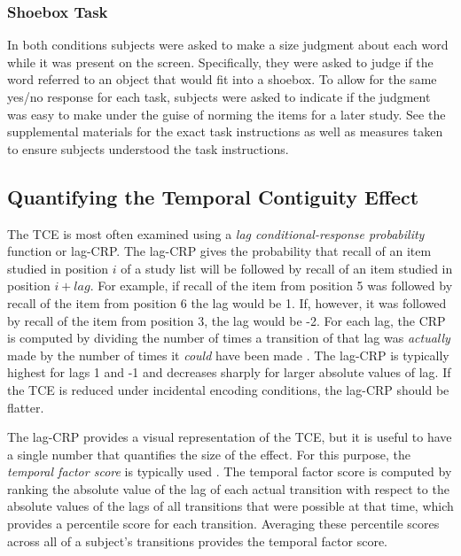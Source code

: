 \documentclass[jou,natbib,floatsintext]{apa6} %
\begin{document}
\subsubsection{Shoebox Task} In both conditions subjects were asked to make a size judgment about each word while it was present on the screen. Specifically, they were asked  to judge if the word referred to an object that would fit into a shoebox. To allow for the same yes/no response for each task, subjects were asked to indicate if the judgment was easy to make under the guise of norming the items for a later study. See the supplemental materials for the exact task instructions as well as measures taken to ensure subjects understood the task instructions.

\subsection{Quantifying the Temporal Contiguity Effect} The TCE is most often examined using a \textit{lag conditional-response probability} function or lag-CRP. The lag-CRP gives the probability that recall of an item studied in position $i$ of a study list will be followed by recall of an item studied in position $i+lag$. For example, if recall of the item from position 5 was followed by recall of the item from position 6 the lag would be 1. If, however, it was followed by recall of the item from position 3, the lag would be -2. For each lag, the CRP is computed by dividing the number of times a transition of that lag was \emph{actually} made by the number of times it \emph{could} have been made \citep[e.g., it could not have been made if the item $i+lag$ was already recalled;][]{Kaha96}. The lag-CRP is typically highest for lags 1 and -1 and decreases sharply for larger absolute values of lag. If the TCE is reduced under incidental encoding conditions, the lag-CRP should be flatter.

The lag-CRP provides a visual representation of the TCE, but it is useful to have a single number that quantifies the size of the effect. For this purpose, the \emph{temporal factor score} is typically used \citep{SedeEtal10,PolyEtal09}. The temporal factor score is computed by ranking the absolute value of the lag of each actual transition with respect to the absolute values of the lags of all transitions that were possible at that time, which provides a percentile score for each transition. Averaging these percentile scores across all of a subject's transitions provides the temporal factor score.
 
\end{document}
